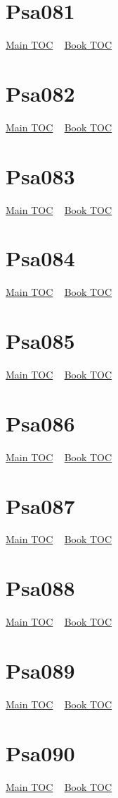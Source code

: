 \documentclass{book}
\begin{document}
  \section{Psa081}\hyperlink{toc}{Main TOC} ~ \hyperref[subsec:Psa]{Book TOC} 
  \section{Psa082}\hyperlink{toc}{Main TOC} ~ \hyperref[subsec:Psa]{Book TOC} 
  \section{Psa083}\hyperlink{toc}{Main TOC} ~ \hyperref[subsec:Psa]{Book TOC} 
  \section{Psa084}\hyperlink{toc}{Main TOC} ~ \hyperref[subsec:Psa]{Book TOC} 
  \section{Psa085}\hyperlink{toc}{Main TOC} ~ \hyperref[subsec:Psa]{Book TOC} 
  \section{Psa086}\hyperlink{toc}{Main TOC} ~ \hyperref[subsec:Psa]{Book TOC} 
  \section{Psa087}\hyperlink{toc}{Main TOC} ~ \hyperref[subsec:Psa]{Book TOC} 
  \section{Psa088}\hyperlink{toc}{Main TOC} ~ \hyperref[subsec:Psa]{Book TOC} 
  \section{Psa089}\hyperlink{toc}{Main TOC} ~ \hyperref[subsec:Psa]{Book TOC} 
  \section{Psa090}\hyperlink{toc}{Main TOC} ~ \hyperref[subsec:Psa]{Book TOC} 
\end{document}
